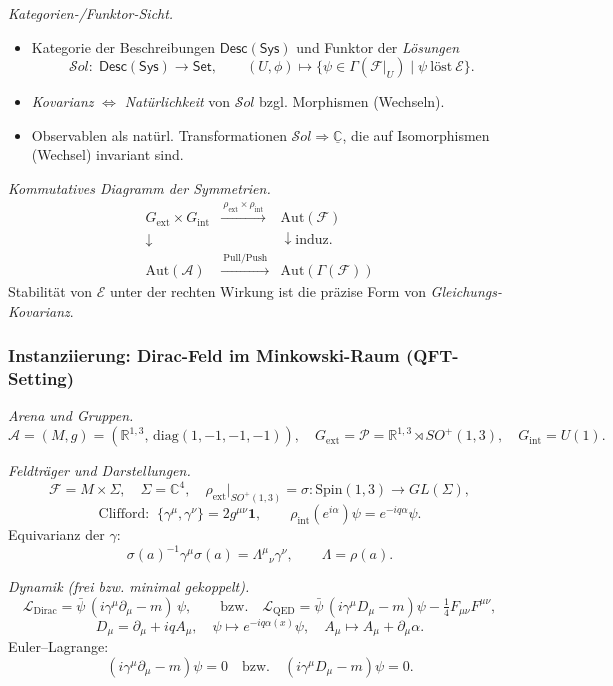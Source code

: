 \documentclass[10pt, letterpaper]{article}
\newcommand{\R}{\mathbb{R}}
\newcommand{\C}{\mathbb{C}}
\newcommand{\Spin}{\mathrm{Spin}}
\begin{document}
\emph{Kategorien-/Funktor-Sicht.}
\begin{itemize}
\item Kategorie der Beschreibungen $\mathsf{Desc}(\mathsf{Sys})$ und Funktor der \emph{Lösungen}
\[
\mathcal{S}ol:\;\mathsf{Desc}(\mathsf{Sys}) \longrightarrow \mathsf{Set},\qquad
(U,\phi)\longmapsto \{\psi\in\Gamma(\mathcal{F}|_U)\mid \psi\ \text{löst}\ \mathcal{E}\}.
\]
\item \emph{Kovarianz} $\Leftrightarrow$ \emph{Natürlichkeit} von $\mathcal{S}ol$ bzgl. Morphismen (Wechseln).
\item Observablen als natürl. Transformationen $\mathcal{S}ol\Rightarrow \underline{\C}$, die auf Isomorphismen (Wechsel) invariant sind.
\end{itemize}

\emph{Kommutatives Diagramm der Symmetrien.}
\[
\begin{array}{ccc}
G_{\mathrm{ext}} \times G_{\mathrm{int}}
 & \xrightarrow{\ \rho_{\mathrm{ext}}\times\rho_{\mathrm{int}} \ } &
\mathrm{Aut}(\mathcal{F}) \\[0.4em]
\downarrow &  & \downarrow \mathrm{induz.} \\[0.4em]
\mathrm{Aut}(\mathcal{A})
 & \xrightarrow{\ \text{Pull/Push}\ } &
\mathrm{Aut}(\Gamma(\mathcal{F}))
\end{array}
\]
Stabilität von $\mathcal{E}$ unter der rechten Wirkung ist die präzise Form von \emph{Gleichungs-Kovarianz}.

\bigskip

\subsubsection*{Instanziierung: Dirac-Feld im Minkowski-Raum (QFT-Setting)}

\emph{Arena und Gruppen.}
\[
\mathcal{A}=(M,g)=(\R^{1,3},\,\mathrm{diag}(1,-1,-1,-1)),\quad
G_{\mathrm{ext}}=\mathcal{P}=\R^{1,3}\rtimes SO^+(1,3),\quad
G_{\mathrm{int}}=U(1).
\]

\emph{Feldträger und Darstellungen.}
\[
\mathcal{F}= M\times \Sigma,\quad \Sigma=\C^4,\quad
\rho_{\mathrm{ext}}|_{SO^+(1,3)}=\sigma:\Spin(1,3)\to GL(\Sigma),
\]
\[
\text{Clifford: }\ \{\gamma^\mu,\gamma^\nu\}=2g^{\mu\nu}\mathbf{1},
\qquad
\rho_{\mathrm{int}}(e^{i\alpha})\psi = e^{-iq\alpha}\psi.
\]
Equivarianz der $\gamma$:
\[
\sigma(a)^{-1}\gamma^\mu\sigma(a)=\Lambda^\mu{}_\nu\gamma^\nu,\qquad \Lambda=\rho(a).
\]

\emph{Dynamik (frei bzw. minimal gekoppelt).}
\[
\mathcal{L}_{\mathrm{Dirac}}=\bar\psi\,(i\gamma^\mu\partial_\mu - m)\,\psi,
\qquad
\text{bzw.}\quad
\mathcal{L}_{\mathrm{QED}}=\bar\psi\,(i\gamma^\mu D_\mu - m)\psi - \tfrac{1}{4}F_{\mu\nu}F^{\mu\nu},
\]
\[
D_\mu=\partial_\mu + i q A_\mu,\quad
\psi \mapsto e^{-iq\alpha(x)}\psi,\quad
A_\mu\mapsto A_\mu+\partial_\mu\alpha.
\]
Euler–Lagrange:
\[
(i\gamma^\mu\partial_\mu - m)\psi=0
\quad\text{bzw.}\quad
(i\gamma^\mu D_\mu - m)\psi=0.
\]
\end{document}
